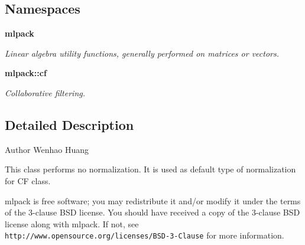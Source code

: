 \subsection*{Namespaces}
\begin{DoxyCompactItemize}
\item 
 \textbf{ mlpack}
\begin{DoxyCompactList}\small\item\em Linear algebra utility functions, generally performed on matrices or vectors. \end{DoxyCompactList}\item 
 \textbf{ mlpack\+::cf}
\begin{DoxyCompactList}\small\item\em Collaborative filtering. \end{DoxyCompactList}\end{DoxyCompactItemize}


\subsection{Detailed Description}
\begin{DoxyAuthor}{Author}
Wenhao Huang
\end{DoxyAuthor}
This class performs no normalization. It is used as default type of normalization for CF class.

mlpack is free software; you may redistribute it and/or modify it under the terms of the 3-\/clause B\+SD license. You should have received a copy of the 3-\/clause B\+SD license along with mlpack. If not, see {\tt http\+://www.\+opensource.\+org/licenses/\+B\+S\+D-\/3-\/\+Clause} for more information. 